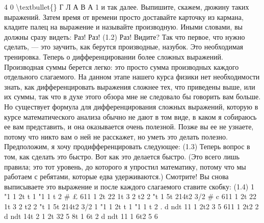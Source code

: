 \documentclass[10pt,oneside]{article}
\begin{document}
4 0 \textbackslash{}textbullet\{\} Г Л А В А  1 и так далее. Выпишите, скажем, дюжину таких выражений. Затем время от времени просто доставайте карточку из кармана, кладите палец на выражение и называйте производную. Иными словами, вы должны сразу видеть: Раз! Раз! (1.2) Раз! Видите? Так что первое, что нужно сделать, --- это заучить, как берутся производные, назубок. Это необходимая тренировка. Теперь о дифференцировании более сложных выражений. Производная суммы берется легко: это просто сумма производных каждого отдельного слагаемого. На данном этапе нашего курса физики нет необходимости знать, как дифференцировать выражения сложнее тех, что приведены выше, или их суммы, так что в духе этого обзора мне не следовало бы говорить вам больше. Но существует формула для дифференцирования сложных выражений, которую в курсе математического анализа обычно не дают в том виде, в каком я собираюсь ее вам представить, и она оказывается очень полезной. Позже вы ее не узнаете, потому что никто вам о ней не расскажет, но уметь это делать полезно. Предположим, я хочу продифференцировать следующее: (1.3) Теперь вопрос в том, как сделать это быстро. Вот как это делается быстро. (Это всего лишь правила; это тот уровень, до которого я упростил математику, потому что мы работаем с ребятами, которые едва удерживаются.) Смотрите! Вы снова выписываете это выражение и после каждого слагаемого ставите скобку: (1.4) 1 "1 1 2t t 1 "1 1 t 2 \# £ 611 1 2t 22 1t 3 2 t2 2 "t 1 5t 214t2 3/2 \# c 611 1 2t 22 1t 3 2 t2 2 "t 1 5t 214t2 3/2 1 "1 1 2t t 1 "1 1 t 2 . d ndt 11 1 2t2 3 5 611 1 2t2 2 d ndt 14t 2 1 2t 32 5 8t 1 6t 2 d ndt 11 1 6t2 5 6\par
\end{document}
